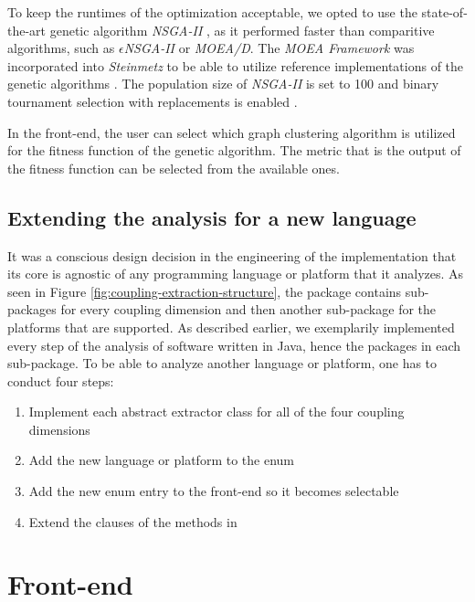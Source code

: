 \documentclass[12pt,a4paper]{report}
\begin{document}
To keep the runtimes of the optimization acceptable, we opted to use the
state\hyp of\hyp the\hyp art genetic algorithm \textit{NSGA-II}
\cite{zitzler2001spea2, li2008multiobjective}, as it performed faster than
comparitive algorithms, such as \textit{$\epsilon$NSGA-II} or \textit{MOEA/D}.
The \textit{MOEA Framework} was incorporated into \textit{Steinmetz} to be able
to utilize reference implementations of the genetic algorithms
\cite{hadka2016beginner}.
The population size of \textit{NSGA-II} is set to 100 and binary
tournament selection with replacements is enabled \cite{hadka2016beginner}.

In the front\hyp end, the user can select which graph clustering algorithm is
utilized for the fitness function of the genetic algorithm.
The metric that is the output of the fitness function can be selected from the
available ones.


\subsection{Extending the analysis for a new language}

It was a conscious design decision in the engineering of the implementation
that its core is agnostic of any programming language or platform that it
analyzes. As seen in Figure \ref{fig:coupling-extraction-structure}, the
 package contains sub\hyp packages for every coupling
dimension and then another sub\hyp package for the platforms that are
supported. As described earlier, we exemplarily implemented every step of the
analysis of software written in Java, hence the  packages in each
 sub\hyp package. To be able to analyze another language or
platform, one has to conduct four steps:
\begin{enumerate}
    \item Implement each abstract extractor class for all of the four coupling dimensions
    \item Add the new language or platform to the  enum
    \item Add the new enum entry to the front-end so it becomes selectable
    \item Extend the clauses of the methods in 
\end{enumerate}



\section{Front-end} \label{sect:implementation-front-end}
\end{document}
